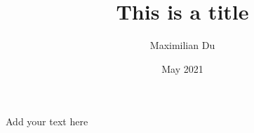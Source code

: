 \documentclass[12pt]{report}
\title{This is a title}
\author{Maximilian Du}
\date{May 2021}
\begin{document}
\maketitle

Add your text here 
\end{document}
